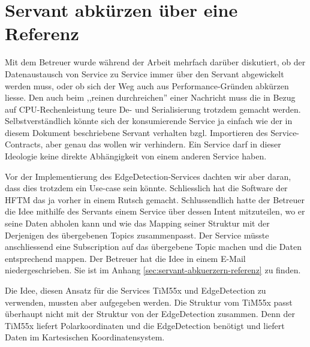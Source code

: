 \section{Servant abkürzen über eine Referenz}
Mit dem Betreuer wurde während der Arbeit mehrfach darüber diskutiert, ob der Datenaustausch von Service zu Service immer über den Servant abgewickelt werden muss, oder ob sich der Weg auch aus Performance-Gründen abkürzen liesse. Den auch beim ,,reinen durchreichen'' einer Nachricht muss die in Bezug auf CPU-Rechenleistung teure De- und Serialisierung trotzdem gemacht werden. Selbstverständlich könnte sich der konsumierende Service ja einfach wie der in diesem Dokument beschriebene Servant verhalten bzgl. Importieren des Service-Contracts, aber genau das wollen wir verhindern. Ein Service darf in dieser Ideologie keine direkte Abhängigkeit von einem anderen Service haben.

Vor der Implementierung des EdgeDetection-Services dachten wir aber daran, dass dies trotzdem ein Use-case sein könnte. Schliesslich hat die Software der HFTM das ja vorher in einem Rutsch gemacht.
Schlussendlich hatte der Betreuer die Idee mithilfe des Servants einem Service über dessen Intent mitzuteilen, wo er seine Daten abholen kann und wie das Mapping seiner Struktur mit der Derjenigen des übergebenen Topics zusammenpasst. Der Service müsste anschliessend eine Subscription auf das übergebene Topic machen und die Daten entsprechend mappen. 
Der Betreuer hat die Idee in einem E-Mail niedergeschrieben. Sie ist im Anhang \ref{sec:servant-abkuerzern-referenz} zu finden. 

Die Idee, diesen Ansatz für die Services TiM55x und EdgeDetection zu verwenden, mussten aber aufgegeben werden. Die Struktur vom TiM55x passt überhaupt nicht mit der Struktur von der EdgeDetection zusammen. Denn der TiM55x liefert Polarkoordinaten und die EdgeDetection benötigt und liefert Daten im Kartesischen Koordinatensystem.

